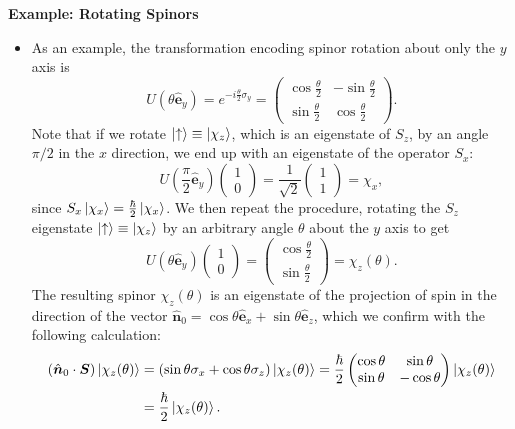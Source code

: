 \documentclass[11pt, a4paper]{article}
\renewcommand{\vec}[1]{\bm{#1}}  %
\newcommand{\uvec}[1]{\hat{\vec{#1}}}  %
\newcommand{\ua}{\uparrow}  %
\begin{document}
\textbf{Example: Rotating Spinors}
\begin{itemize}
	\item As an example, the transformation encoding spinor rotation about only the $ y $ axis is
	\begin{equation*}
		U(\theta \uvec{e}_{y}) = e^{-i\frac{\theta}{2}\sigma_{y}} = 
		\begin{pmatrix}
            \cos \frac{\theta}{2} & - \sin \frac{\theta}{2} \\[1mm]
			\sin \frac{\theta}{2} & \cos \frac{\theta}{2} 
		\end{pmatrix}.
	\end{equation*}
	Note that if we rotate $ \ket{\ua} \equiv \ket{\chi_{z}} $, which is an eigenstate of $ S_{z} $, by an angle $ \pi/2 $ in the $ x $ direction, we end up with an eigenstate of the operator $ S_{x} $:
	\begin{equation*}
		U\left(\frac{\pi}{2}\uvec{e}_{y} \right) 
		\begin{pmatrix}
			1\\
			0
		\end{pmatrix}
		= \frac{1}{\sqrt{2}} 
		\begin{pmatrix}
			1\\
			1
		\end{pmatrix}
		= \chi_{x},
	\end{equation*}
	since $ S_{x}\ket{\chi_{x}} = \frac{\hbar}{2}\ket{\chi_{x}} $. We then repeat the procedure, rotating the $ S_{z} $ eigenstate $ \ket{\ua} \equiv \ket{\chi_{z}} $ by an arbitrary angle $ \theta $ about the $ y $ axis to get
	\begin{equation*}
		U(\theta \uvec{e}_{y})
		\begin{pmatrix}
			1\\
			0
		\end{pmatrix}
		=
		\begin{pmatrix}
            \cos \frac{\theta}{2}\\[2mm]
			\sin \frac{\theta}{2}
		\end{pmatrix}
        = \chi_{z}(\theta).
	\end{equation*}
    The resulting spinor $ \chi_{z}(\theta) $ is an eigenstate of the projection of spin in the direction of the vector $ \uvec{n}_{0} = \cos \theta \uvec{e}_{x} + \sin \theta \uvec{e}_{z} $, which we confirm with the following calculation:
	\begin{align*}
		(\uvec{n}_{0}\cdot \vec{S})\ket{\chi_{z}(\theta)} &= (\sin \theta \sigma_{x} + \cos \theta \sigma_{z})\ket{\chi_{z}(\theta)} = \frac{\hbar}{2}
		\begin{pmatrix}
			\cos \theta & \sin \theta\\
			\sin \theta & - \cos \theta
		\end{pmatrix}
		\ket{\chi_{z}(\theta)}\\
		& = \frac{\hbar}{2}\ket{\chi_{z}(\theta)}.
	\end{align*}
	

\end{itemize}
\end{document}
